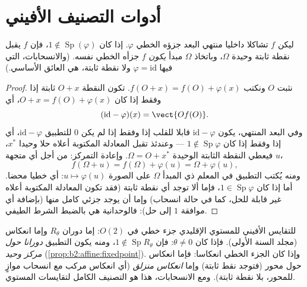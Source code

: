 \section{أدوات التصنيف الأفيني}

\begin{proposition}\label{prop:b2:affine:fixedpoint}
ليكن $f$ تشاكلا  داخليا  منتهي البعد جزؤه الخطي
$\varphi$. إذا كان $1 \notin
\operatorname{Sp}(\varphi)$، فإن $f$ يقبل نقطة ثابتة وحيدة $\Omega$،
وباتخاذ $\Omega$ مبدأ \emph{يكون} $f$ جزأه الخطي نفسه. (والانسحابات،
التي فيها $\varphi = \mathrm{id}$ ولا نقطة ثابتة، هي العائق الأساسي.)
\end{proposition}

\begin{proof}
نثبت $O$ ونكتب $f(O + x) = f(O) + \varphi(x)$. تكون النقطة $O + x$ ثابتة إذا وفقط إذا كان
$O + x = f(O) + \varphi(x)$، أي
\[
(\mathrm{id} - \varphi)(x) = \vect{O f(O)} .
\]
وفي البعد المنتهي، يكون $\mathrm{id} - \varphi$ قابلا للقلب إذا وفقط إذا لم يكن
$0$  للتطبيق $\mathrm{id} - \varphi$، أي إذا وفقط إذا كان $1 \notin \operatorname{Sp}\varphi$ ---
وعندئذ تقبل المعادلة المكتوبة أعلاه حلا وحيدا $x^*$، فيعطي النقطة
الثابتة الوحيدة $\Omega = O + x^*$. وإعادة التمركز: من أجل أي متجهة $u$،
\[
f(\Omega + u) = f(\Omega) + \varphi(u) = \Omega + \varphi(u),
\]
ومنه يُكتب التطبيق في المعلم ذي المبدأ $\Omega$ على الصورة $u \mapsto
\varphi(u)$: أي
خطيا محضا. أما إذا كان $1 \in
\operatorname{Sp}\varphi$، فإما ألا توجد أي نقطة ثابتة (فقد
تكون المعادلة المكتوبة أعلاه غير قابلة للحل، كما في حالة انسحاب)
وإما أن يوجد  جزئي كامل منها (بإضافة أي  موافقة
 $1$ إلى حل): فالوحدانية هي بالضبط الشرط الطيفي.
\end{proof}

\begin{example}\label{ex:b2:affine:isometries}
للتقايس الأفيني للمستوي الإقليدي جزء خطي في $O(2)$: إما دوران $R_\theta$
وإما انعكاس (مجلد السنة الأولى). فإذا كان $\theta \neq 0$: فإن $1 \notin \operatorname{Sp} R_\theta$، ومنه
يكون التطبيق \emph{دورانا حول مركز وحيد} (\cref{prop:b2:affine:fixedpoint}). وإذا كان الجزء
الخطي انعكاسا: فإما انعكاس حول محور (فتوجد نقط ثابتة) وإما
\emph{انعكاس منزلق} (أي انعكاس مركب مع انسحاب موازٍ للمحور، بلا نقطة
ثابتة). ومع الانسحابات، هذا هو التصنيف الكامل لتقايسات المستوي.
\end{example}

